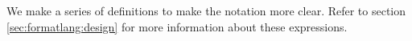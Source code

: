     We make a series of definitions to make the notation more clear. Refer to section \ref{sec:formatlang:design} for more information
    about these expressions.

